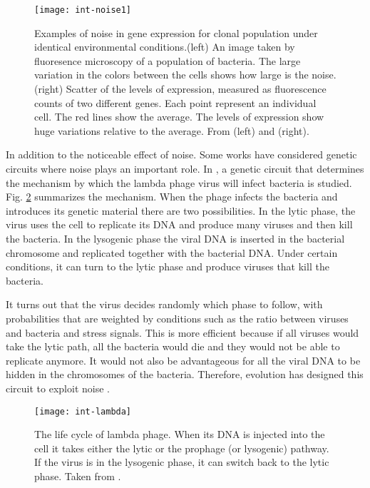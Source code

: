 \begin{figure}[H]
  \centering
  \texttt{[image: int-noise1]}
  \caption[Examples of noise in gene expression]{\label{fig:int-noise1}Examples of noise in gene expression for clonal population under identical environmental conditions.(left) An image taken by fluoresence microscopy of a population of bacteria. The large variation in the colors between the cells shows how large is the noise.(right) Scatter of the levels of expression, measured as fluorescence counts of two different genes. Each point represent an individual cell. The red lines show the average. The levels of expression show huge variations relative to the average. From \cite{elowitz02} (left) and \cite{pedraza05} (right).}
\end{figure}

In addition to the noticeable effect of noise. Some works have considered genetic circuits where noise plays an important role. In \cite{arkin98}, a genetic circuit that determines the mechanism by which the lambda phage virus will infect bacteria is studied. Fig. \ref{fig:int-lambda} summarizes the mechanism. When the phage infects the bacteria and introduces its genetic material there are two possibilities. In the lytic phase, the virus uses the cell to replicate its DNA and produce many viruses and then kill the bacteria. In the lysogenic phase the viral DNA is inserted in the bacterial chromosome and replicated together with the bacterial DNA. Under certain conditions, it can turn to the lytic phase and produce viruses that kill the bacteria.

It turns out that the virus decides randomly which phase to follow, with probabilities that are weighted by conditions such as the ratio between viruses and bacteria and stress signals. This is more efficient because if all viruses would take the lytic path, all the bacteria would die and they would not be able to replicate anymore. It would not also be advantageous for all the viral DNA to be hidden in the chromosomes of the bacteria. Therefore, evolution has designed this circuit to exploit noise \cite{arkin98}.

\begin{figure}[H]
  \centering
  \texttt{[image: int-lambda]}
  \caption[Life cycle of lambda phage]{\label{fig:int-lambda} The life cycle of lambda phage. When its DNA is injected into the cell it takes either the lytic or the prophage (or lysogenic) pathway. If the virus is in the lysogenic phase, it can switch back to the lytic phase. Taken from \cite{alberts08}.}
\end{figure}

